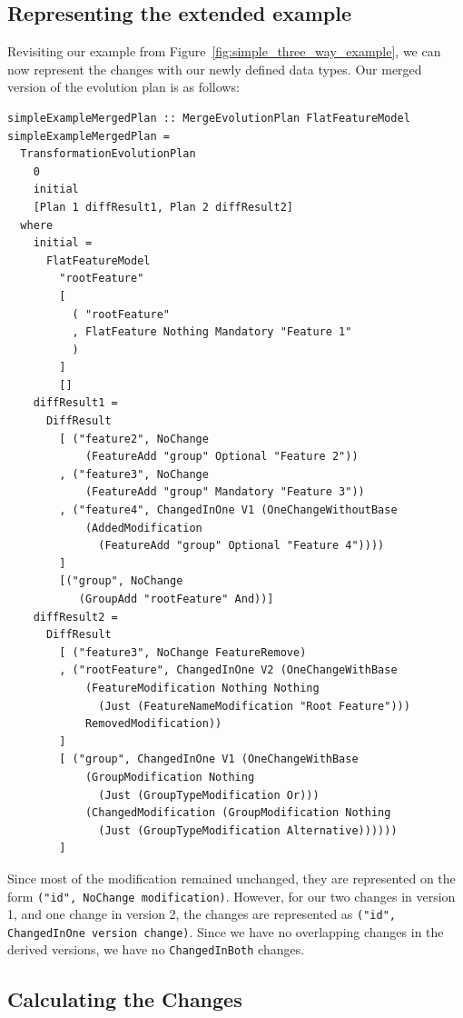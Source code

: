 \documentclass[a4paper,english]{ifimaster}
\begin{document}
\subsection{Representing the extended example}%
\label{sub:representing_the_extended_example}

Revisiting our example from Figure~\ref{fig:simple_three_way_example}, we can now represent the changes with our newly defined data types. Our merged version of the evolution plan is as follows:

\begin{verbatim}
simpleExampleMergedPlan :: MergeEvolutionPlan FlatFeatureModel
simpleExampleMergedPlan =
  TransformationEvolutionPlan
    0
    initial
    [Plan 1 diffResult1, Plan 2 diffResult2]
  where
    initial =
      FlatFeatureModel
        "rootFeature"
        [
          ( "rootFeature"
          , FlatFeature Nothing Mandatory "Feature 1"
          )
        ]
        []
    diffResult1 =
      DiffResult
        [ ("feature2", NoChange 
            (FeatureAdd "group" Optional "Feature 2"))
        , ("feature3", NoChange
            (FeatureAdd "group" Mandatory "Feature 3"))
        , ("feature4", ChangedInOne V1 (OneChangeWithoutBase 
            (AddedModification 
              (FeatureAdd "group" Optional "Feature 4"))))
        ]
        [("group", NoChange 
           (GroupAdd "rootFeature" And))]
    diffResult2 =
      DiffResult
        [ ("feature3", NoChange FeatureRemove)
        , ("rootFeature", ChangedInOne V2 (OneChangeWithBase 
            (FeatureModification Nothing Nothing 
              (Just (FeatureNameModification "Root Feature"))) 
            RemovedModification))
        ]
        [ ("group", ChangedInOne V1 (OneChangeWithBase 
            (GroupModification Nothing 
              (Just (GroupTypeModification Or))) 
            (ChangedModification (GroupModification Nothing 
              (Just (GroupTypeModification Alternative))))))
        ]
\end{verbatim}

Since most of the modification remained unchanged, they are represented on the form \texttt{("id", NoChange modification)}. However, for our two changes in version 1, and one change in version 2, the changes are represented as \texttt{("id", ChangedInOne version change)}. Since we have no overlapping changes in the derived versions, we have no \texttt{ChangedInBoth} changes.

\subsection{Calculating the Changes}%
\label{sub:calculating_the_changes}
\end{document}
